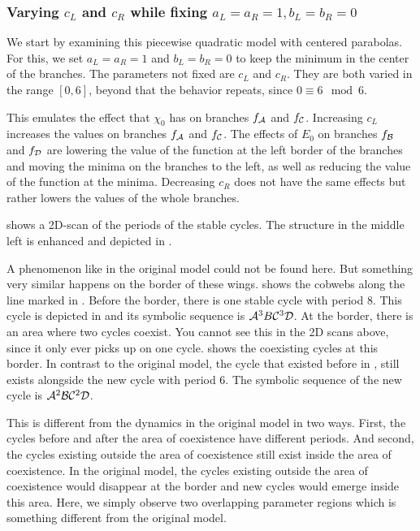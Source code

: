 \subsubsection{Varying $c_L$ and $c_R$ while fixing $a_L = a_R = 1, b_L = b_R = 0$}

We start by examining this piecewise quadratic model with centered parabolas.
For this, we set $a_L = a_R = 1$ and $b_L = b_R = 0$ to keep the minimum in the center of the branches.
The parameters not fixed are $c_L$ and $c_R$.
They are both varied in the range $[0, 6]$, beyond that the behavior repeats, since $0 \equiv 6 \mod 6$.

This emulates the effect that $\chi_0$ has on branches $f_{\mathcal{A}}$ and $f_{\mathcal{C}}$.
Increasing $c_L$ increases the values on branches $f_{\mathcal{A}}$ and $f_{\mathcal{C}}$.
The effects of $E_0$ on branches $f_{\mathcal{B}}$ and $f_{\mathcal{D}}$ are lowering the value of the function at the left border of the branches and moving the minima on the branches to the left, as well as reducing the value of the function at the minima.
Decreasing $c_R$ does not have the same effects but rather lowers the values of the whole branches.

 shows a 2D-scan of the periods of the stable cycles.
The structure in the middle left is enhanced and depicted in .

A phenomenon like in the original model could not be found here.
But something very similar happens on the border of these wings.
 shows the cobwebs along the line marked in .
Before the border, there is one stable cycle with period 8.
This cycle is depicted in  and its symbolic sequence is $\mathcal{A}^3B\mathcal{C}^3\mathcal{D}$.
At the border, there is an area where two cycles coexist.
You cannot see this in the 2D scans above, since it only ever picks up on one cycle.
 shows the coexisting cycles at this border.
In contrast to the original model, the cycle that existed before in , still exists alongside the new cycle with period 6.
The symbolic sequence of the new cycle is $\mathcal{A}^2\mathcal{B}\mathcal{C}^2\mathcal{D}$.

This is different from the dynamics in the original model in two ways.
First, the cycles before and after the area of coexistence have different periods.
And second, the cycles existing outside the area of coexistence still exist inside the area of coexistence.
In the original model, the cycles existing outside the area of coexistence would disappear at the border and new cycles would emerge inside this area.
Here, we simply observe two overlapping parameter regions which is something different from the original model.

